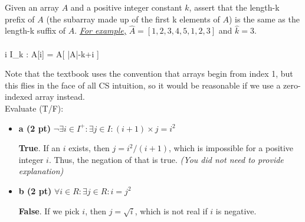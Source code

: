 \documentclass[a4 paper]{article}
\begin{document}
\vspace{5mm}
\problem{1 \textbf{(6pt)}} %
Given an array $A$ and a positive integer constant $k$, assert that the length-k prefix of $A$ (the subarray made up of the first k elements of $A$) is the same as the length-k suffix of $A$. \emph{\underline{For example,}} $\hat{A}=[1,2,3,4,5,1,2,3]$ and $\hat{k}=3$.\vspace{2mm}\\
\solution{}\\
         \forall i \in I_k : A[i] = A[ |A|-k+i ]

         Note that the textbook uses the convention that arrays begin from index 1, but this flies in the face of all CS intuition, so it would be reasonable if we use a zero-indexed array instead.\vspace{10mm}\\
\problem{2 \textbf{(4pt)}}   Evaluate (T/F):
\begin{itemize}
    \item \textbf{a (2 pt)} $\neg \exists i \in I^+ : \exists j \in I : (i+1)\times j = i^2$
    
    \solution{} \textbf{True}. If an $i$ exists, then $j=i^2/(i+1)$, which is impossible for a positive integer $i$.  Thus, the negation of that is true. \emph{(You did not need to provide explanation)}\vspace{1mm}
    
    \item \textbf{b (2 pt)} $\forall i \in R : \exists j \in R : i = j^2$
    
    \solution{} \textbf{False}. If we pick $i$, then $j = \sqrt{i}$, which is not real if $i$ is negative.
\end{itemize}
\end{document}
